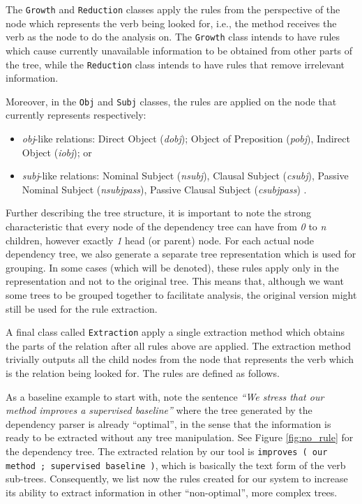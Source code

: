 \documentclass[11pt,a4paper,openright]{memoir}
\begin{document}
The \texttt{Growth} and \texttt{Reduction} classes apply the rules from the perspective of the node which represents the verb being looked for, i.e., the method receives the verb as the node to do the analysis on. The \texttt{Growth} class intends to have rules which cause currently unavailable information to be obtained from other parts of the tree, while the \texttt{Reduction} class intends to have rules that remove irrelevant information.

Moreover, in the \texttt{Obj} and \texttt{Subj} classes, the rules are applied on the node that currently represents respectively:

\begin{itemize}
  \item \emph{obj}-like relations: Direct Object (\emph{dobj}); Object of Preposition (\emph{pobj}), Indirect Object (\emph{iobj}); or
  \item \emph{subj}-like relations: Nominal Subject (\emph{nsubj}), Clausal Subject  (\emph{csubj}), Passive Nominal Subject (\emph{nsubjpass}), Passive Clausal Subject (\emph{csubjpass}) \cite{Marneffe08stanfordtyped}.
\end{itemize}

Further describing the tree structure, it is important to note the strong characteristic that every node of the dependency tree can have from \emph{0} to \emph{n} children, however exactly \emph{1} head (or parent) node. For each actual node dependency tree, we also generate a separate tree representation which is used for grouping. In some cases (which will be denoted), these rules apply only in the representation and not to the original tree. This means that, although we want some trees to be grouped together to facilitate analysis, the original version might still be used for the rule extraction.

A final class called \texttt{Extraction} apply a single extraction method which obtains the parts of the relation after all rules above are applied. The extraction method trivially outputs all the child nodes from the node that represents the verb which is the relation being looked for. The rules are defined as follows.

As a baseline example to start with, note the sentence \emph{\enquote{We stress that our method improves a supervised baseline}} where the tree generated by the dependency parser is already \enquote{optimal}, in the sense that the information is ready to be extracted without any tree manipulation. See Figure \ref{fig:no_rule} for the dependency tree. The extracted relation by our tool is \texttt{improves ( our method ; supervised baseline )}, which is basically the text form of the verb sub-trees. Consequently, we list now the rules created for our system to increase its ability to extract information in other \enquote{non-optimal}, more complex trees. 
\end{document}
